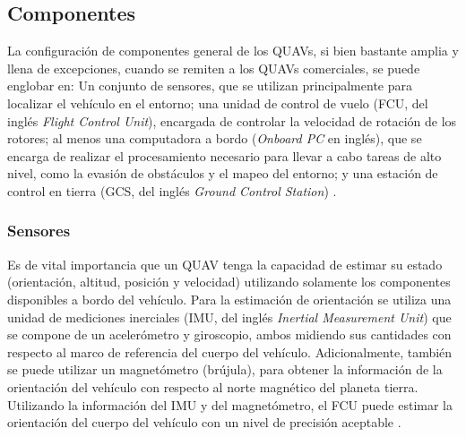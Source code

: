 \subsection{Componentes}

La configuración de componentes general de los QUAVs, si bien bastante amplia y llena de excepciones, cuando se remiten a los QUAVs comerciales, se puede englobar en: Un conjunto de sensores, que se utilizan principalmente para localizar el vehículo en el entorno; una unidad de control de vuelo (FCU, del inglés \textit{Flight Control Unit}), encargada de controlar la velocidad de rotación de los rotores; al menos una computadora a bordo (\textit{Onboard PC} en inglés), que se encarga de realizar el procesamiento necesario para llevar a cabo tareas de alto nivel, como la evasión de obstáculos y el mapeo del entorno; y una estación de control en tierra (GCS, del inglés \textit{Ground Control Station}) \cite{multidrone2017review}. 

\subsubsection*{Sensores}
\label{sec:QUAV-sensors}

Es de vital importancia que un QUAV tenga la capacidad de estimar su estado (orientación, altitud, posición y velocidad) utilizando solamente los componentes disponibles a bordo del vehículo. Para la estimación de orientación se utiliza una unidad de mediciones inerciales \cite{multidrone2017review} (IMU, del inglés \textit{Inertial Measurement Unit}) que se compone de un acelerómetro y giroscopio, ambos midiendo sus cantidades con respecto al marco de referencia del cuerpo del vehículo. Adicionalmente, también se puede utilizar un magnetómetro (brújula), para obtener la información de la orientación del vehículo con respecto al norte magnético del planeta tierra. Utilizando la información del IMU y del magnetómetro, el FCU puede estimar la orientación del cuerpo del vehículo con un nivel de precisión aceptable \cite{multidrone2017review}.

